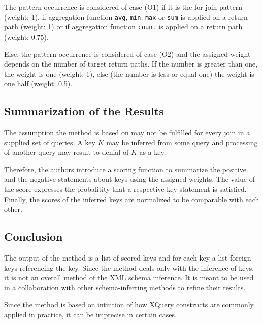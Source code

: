 The pattern occurrence is considered of case (O1) if it is the for join pattern (weight: 1), if aggregation function \texttt{avg}, \texttt{min}, \texttt{max} or \texttt{sum} is applied on a return path (weight: 1) or if aggregation function \texttt{count} is applied on a return path (weight: 0.75). 

Else, the pattern occurrence is considered of case (O2) and the assigned weight depends on the number of target return paths. If the number is greater than one, the weight is one (weight: 1), else (the number is less or equal one) the weight is one half (weight: 0.5).

\subsection{Summarization of the Results}

The assumption the method is based on may not be fulfilled for every join in a supplied set of queries. A key $K$ may be inferred from some query and processing of another query may result to denial of $K$ as a key. 

Therefore, the authors introduce a scoring function to summarize the positive and the negative statements about keys using the assigned weights. The value of the score expresses the probalitity that a respective key statement is satisfied. Finally, the scores of the inferred keys are normalized to be comparable with each other.

\subsection{Conclusion}
The output of the method is a list of scored keys and for each key a list foreign keys referencing the key. Since the method deals only with the inference of keys, it is not an overall method of the XML schema inference. It is meant to be used in a collaboration with other schema-inferring methods to refine their results.

Since the method is based on intuition of how XQuery constructs are commonly applied in practice, it can be imprecise in certain cases.

